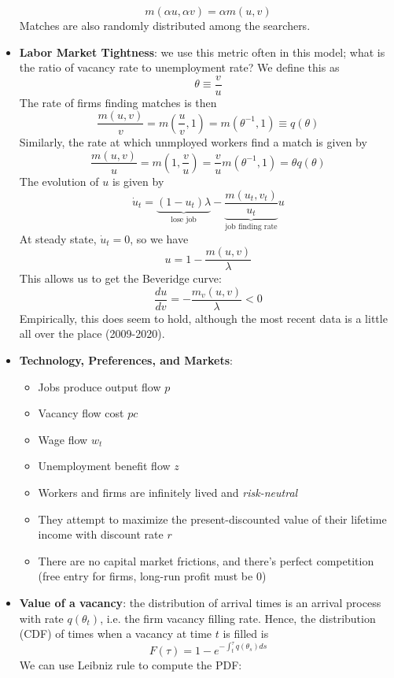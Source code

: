 \documentclass[12pt]{article}
\begin{document}
\begin{itemize}
    \[m(\alpha u, \alpha v) = \alpha m(u,v)\]
    Matches are also randomly distributed among the searchers. 
    \item \textbf{Labor Market Tightness}: we use this metric often in this model; what is the ratio of vacancy rate to unemployment rate? We define this as
    \[\theta \equiv \frac{v}{u}\]
    The rate of firms finding matches is then
    \[\frac{m(u,v)}{v} = m\left(\frac{u}{v}, 1\right) = m(\theta^{-1}, 1) \equiv q(\theta)\]
    Similarly, the rate at which unmployed workers find a match is given by
    \[\frac{m(u,v)}{u} = m\left(1, \frac{v}{u}\right) = \frac{v}{u}m(\theta^{-1}, 1) = \theta q(\theta)\]
    The evolution of $u$ is given by
    \[\dot{u}_t = \underbrace{(1-u_t)\lambda}_{\text{lose job}} - \underbrace{\frac{m(u_t,v_t)}{u_t}}_{\text{job finding rate}}u\]
    At steady state, $\dot{u}_t = 0$, so we have
    \[u = 1 - \frac{m(u,v)}{\lambda}\]
    This allows us to get the Beveridge curve:
    \begin{equation}\label{Beveridge Curve}
        \frac{d u}{d v} = -\frac{m_v(u,v)}{\lambda} < 0
    \end{equation}
    Empirically, this does seem to hold, although the most recent data is a little all over the place (2009-2020).
    \item \textbf{Technology, Preferences, and Markets}: 
    \begin{itemize}
        \item Jobs produce output flow $p$
        \item Vacancy flow cost $pc$
        \item Wage flow $w_t$
        \item Unemployment benefit flow $z$
        \item Workers and firms are infinitely lived and \textit{risk-neutral}
        \item They attempt to maximize the present-discounted value of their lifetime income with discount rate $r$
        \item There are no capital market frictions, and there's perfect competition (free entry for firms, long-run profit must be 0)
    \end{itemize}
    \item \textbf{Value of a vacancy}: the distribution of arrival times is an arrival process with rate $q(\theta_t)$, i.e. the firm vacancy filling rate. Hence, the distribution (CDF) of times when a vacancy at time $t$ is filled is
    \[F(\tau) = 1 - e^{-\int_t^{\tau}q(\theta_s)ds}\]
    We can use Leibniz rule to compute the PDF:

\end{itemize}
\end{document}
